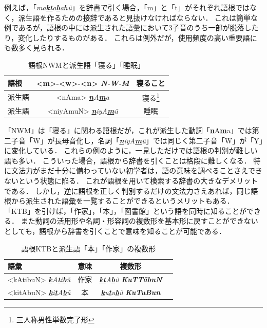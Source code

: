 \documentclass[technicalreport]{ieicej}
\begin{document}
例えば，「\textit{ma\underline{\textbf{k}}\underline{\textbf{t}}a\underline{\textbf{b}}a$\hbar$\~u}」を辞書で引く場合，「m」と「t」がそれぞれ語根ではなく，派生語を作るための接辞であると見抜けなければならない．
これは簡単な例であるが，語根の中には派生された語彙において3子音のうち一部が脱落したり，変化したりするものがある．
これらは例外だが，使用頻度の高い重要語にも数多く見られる．

\begin{table}[ht]
\begin{center}
\begin{tabular}{l|cc}
   語根 & <m>-<w>-<n> \textit{\textbf{N-W-M}} & 寝ること\\
  \hline
 派生語& <nAma> \textit{\underline{\textbf{n}}A\underline{\textbf{m}}a} & 寝る\footnote{三人称男性単数完了形}\\
  派生語& <niyAmuN> \textit{\underline{\textbf{n}}iyA\underline{\textbf{m}}\~u} & 睡眠\\
\hline
\end{tabular}
\caption{語根NWMと派生語「寝る」「睡眠」}

\label{table:alignment}
\end{center}
\end{table}

「NWM」は「寝る」に関わる語根だが，これが派生した動詞「{\underline{\textbf{n}}A\underline{\textbf{m}}a}」では第二子音「W」が長母音化し，名詞「\textit{\underline{\textbf{n}}iyA\underline{\textbf{m}}\~u}」では同じく第二子音「W」が「Y」に変化している．
これらの例のように，一見しただけでは語根の判別が難しい語も多い．
こういった場合，語根から辞書を引くことは格段に難しくなる．
特に文法力がまだ十分に備わっていない初学者は，語の意味を調べることさえできないという状態に陥る．
これが語根を用いて検索する辞書の大きなデメリットである．
しかし，逆に語根を正しく判別するだけの文法力さえあれば，同じ語根から派生された語彙を一覧することができるというメリットもある．
「KTB」を引けば，「作家」，「本」，「図書館」という語を同時に知ることができる．
また動詞の活用形や名詞・形容詞の複数形を基本形に戻すことができないとしても，語根から辞書を引くことで意味を知ることが可能である．

\begin{table}[ht]
\begin{center}
\begin{tabular}{l|ccc}
   語彙 & 意味 & 複数形\\
  \hline
  <kAtibuN> \textit{\underline{\textbf{k}}A\underline{\textbf{t}}i\underline{\textbf{b}}\~u} & 作家 & \textit{\underline{\textbf{k}}\underline{\textbf{t}}A\underline{\textbf{b}}\~u} \textit{\textbf{KuTT\=abuN}}\\
  <kitAbuN> \textit{\underline{\textbf{k}}i\underline{\textbf{t}}A\underline{\textbf{b}}\~u} & 本 & \textit{\underline{\textbf{k}}u\underline{\textbf{t}}u\underline{\textbf{b}}\~u} \textit{\textbf{KuTuBun}}\\
\hline
\end{tabular}
\caption{語根KTBと派生語「本」「作家」の複数形}
\label{table:alignment}
\end{center}
\end{table}
\end{document}
